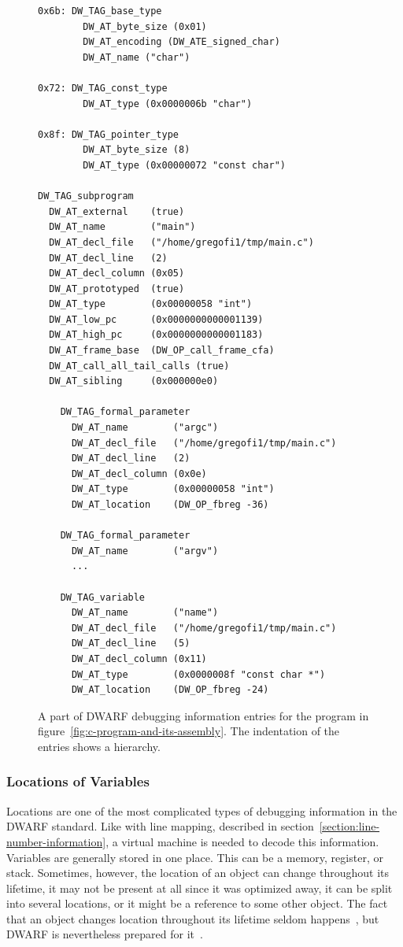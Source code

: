 \begin{figure}
    \begin{lstlisting}
0x6b: DW_TAG_base_type
        DW_AT_byte_size (0x01)
        DW_AT_encoding (DW_ATE_signed_char)
        DW_AT_name ("char")

0x72: DW_TAG_const_type
        DW_AT_type (0x0000006b "char")

0x8f: DW_TAG_pointer_type
        DW_AT_byte_size	(8)
        DW_AT_type (0x00000072 "const char")

DW_TAG_subprogram
  DW_AT_external	(true)
  DW_AT_name	    ("main")
  DW_AT_decl_file	("/home/gregofi1/tmp/main.c")
  DW_AT_decl_line	(2)
  DW_AT_decl_column	(0x05)
  DW_AT_prototyped	(true)
  DW_AT_type        (0x00000058 "int")
  DW_AT_low_pc      (0x0000000000001139)
  DW_AT_high_pc	    (0x0000000000001183)
  DW_AT_frame_base	(DW_OP_call_frame_cfa)
  DW_AT_call_all_tail_calls	(true)
  DW_AT_sibling	    (0x000000e0)

    DW_TAG_formal_parameter
      DW_AT_name	    ("argc")
      DW_AT_decl_file	("/home/gregofi1/tmp/main.c")
      DW_AT_decl_line	(2)
      DW_AT_decl_column	(0x0e)
      DW_AT_type	    (0x00000058 "int")
      DW_AT_location	(DW_OP_fbreg -36)

    DW_TAG_formal_parameter
      DW_AT_name	    ("argv")
      ...

    DW_TAG_variable
      DW_AT_name	    ("name")
      DW_AT_decl_file	("/home/gregofi1/tmp/main.c")
      DW_AT_decl_line	(5)
      DW_AT_decl_column	(0x11)
      DW_AT_type	    (0x0000008f "const char *")
      DW_AT_location	(DW_OP_fbreg -24)
    \end{lstlisting}
    \caption{A part of DWARF debugging information entries for the program in
    figure~\ref{fig:c-program-and-its-assembly}. The indentation of the entries
    shows a hierarchy.}
    \label{fig:dwarf-die}
\end{figure}

\subsubsection{Locations of Variables}\label{section:dwarf-location}
Locations are one of the most complicated types of debugging information in the
DWARF standard. Like with line mapping, described in
section~\ref{section:line-number-information}, a virtual machine is needed to
decode this information. Variables are generally stored in one place. This can
be a memory, register, or stack. Sometimes, however, the location of an object
can change throughout its lifetime, it may not be present at all since it was
optimized away, it can be split into several locations, or it might be a
reference to some other object. The fact that an object changes location
throughout its lifetime seldom happens~\cite{dwarf-intro}, but DWARF is
nevertheless prepared for it~\cite{dwarf}.

